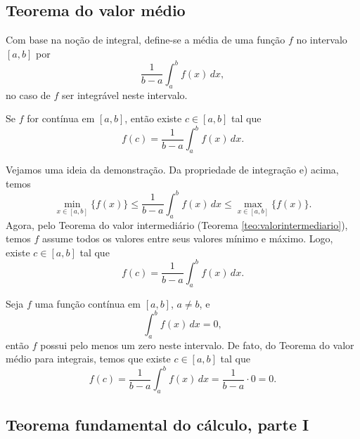 \subsection{Teorema do valor médio}

Com base na noção de integral, define-se a média de uma função $f$ no intervalo $[a, b]$ por
\begin{equation}
  \frac{1}{b-a}\int_a^b f(x)\,dx,
\end{equation}
no caso de $f$ ser integrável neste intervalo.

\begin{teo}\label{teo:int_teomed}
  Se $f$ for contínua em $[a, b]$, então existe $c\in [a, b]$ tal que
  \begin{equation}
    f(c) = \frac{1}{b-a}\int_a^b f(x)\,dx.
  \end{equation}
\end{teo}
\begin{dem}
  Vejamos uma ideia da demonstração. Da propriedade de integração e) acima, temos
  \begin{equation}
    \min_{x\in [a, b]} \{f(x)\} \leq \frac{1}{b-a}\int_a^b f(x)\,dx \leq \max_{x\in [a, b]} \{f(x)\}.
  \end{equation}
  Agora, pelo Teorema do valor intermediário (Teorema \ref{teo:valorintermediario}), temos $f$ assume todos os valores entre seus valores mínimo e máximo. Logo, existe $c\in [a, b]$ tal que
  \begin{equation}
    f(c) = \frac{1}{b-a}\int_a^b f(x)\,dx.
  \end{equation}  
\end{dem}

\begin{ex}
  Seja $f$ uma função contínua em $[a, b]$, $a\neq b$, e
  \begin{equation}
    \int_a^b f(x)\,dx = 0,
  \end{equation}
  então $f$ possui pelo menos um zero neste intervalo. De fato, do Teorema do valor médio para integrais, temos que existe $c\in [a, b]$ tal que
  \begin{equation}
    f(c) = \frac{1}{b-a}\int_a^b f(x)\,dx = \frac{1}{b-a}\cdot 0 = 0.
  \end{equation}
\end{ex}

\subsection{Teorema fundamental do cálculo, parte I}


